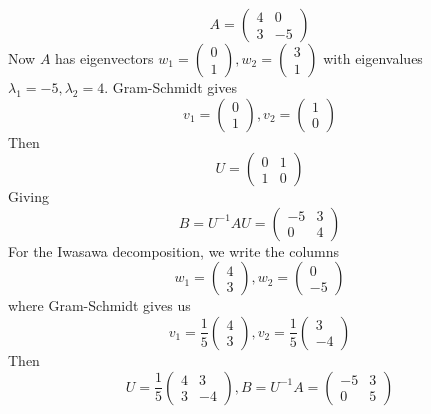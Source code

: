 \documentclass[12pt]{article}
\begin{document}
\begin{ex}
	$$A = \begin{pmatrix} 4 & 0 \\ 3 & -5 \end{pmatrix}$$
	Now $A$ has eigenvectors $w_1 = \begin{pmatrix} 0 \\ 1 \end{pmatrix}, w_2 = \begin{pmatrix} 3 \\ 1 \end{pmatrix}$ with eigenvalues $\lambda_1 = -5, \lambda_2 = 4$. Gram-Schmidt gives 
	$$v_1 = \begin{pmatrix} 0 \\ 1 \end{pmatrix}, v_2 = \begin{pmatrix} 1 \\ 0 \end{pmatrix}$$
	Then
	$$U = \begin{pmatrix} 0 & 1 \\ 1 & 0 \end{pmatrix}$$
	Giving
	$$B = U^{-1}AU = \begin{pmatrix} -5 & 3 \\ 0 & 4 \end{pmatrix}$$
	For the Iwasawa decomposition, we write the columns
	$$w_1 = \begin{pmatrix} 4 \\ 3 \end{pmatrix}, w_2 = \begin{pmatrix} 0 \\ -5 \end{pmatrix}$$
	where Gram-Schmidt gives us
	$$v_1 = \frac{1}{5} \begin{pmatrix} 4 \\ 3 \end{pmatrix}, v_2 = \frac{1}{5} \begin{pmatrix} 3 \\ -4 \end{pmatrix}$$
	Then
	$$U = \frac{1}{5} \begin{pmatrix} 4 & 3 \\ 3 & -4 \end{pmatrix}, B = U^{-1}A = \begin{pmatrix} -5 & 3 \\ 0 & 5 \end{pmatrix}$$
\end{ex}
\end{document}
